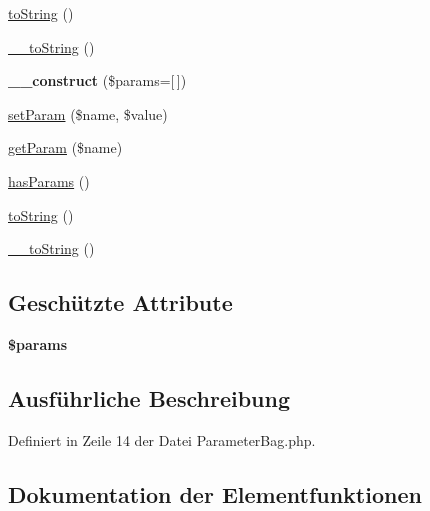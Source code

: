 \begin{DoxyCompactItemize}
\item 
\mbox{\hyperlink{class_eluceo_1_1i_cal_1_1_parameter_bag_a3dbe3cb1bc77cd42647b9c3b9cc1cd74}{to\+String}} ()
\item 
\mbox{\hyperlink{class_eluceo_1_1i_cal_1_1_parameter_bag_ad6ae633e87f62df95793c0b3bad3f2b6}{\+\_\+\+\_\+to\+String}} ()
\item 
\mbox{\label{class_eluceo_1_1i_cal_1_1_parameter_bag_a3869e226ebd229897354d1d70437e2e3}} 
{\bfseries \+\_\+\+\_\+construct} (\$params=\mbox{[}$\,$\mbox{]})
\item 
\mbox{\hyperlink{class_eluceo_1_1i_cal_1_1_parameter_bag_ac29f2bbb42fdbc435df23623ea5779cd}{set\+Param}} (\$name, \$value)
\item 
\mbox{\hyperlink{class_eluceo_1_1i_cal_1_1_parameter_bag_add3451bf728adf15b29f69a51b2bff08}{get\+Param}} (\$name)
\item 
\mbox{\hyperlink{class_eluceo_1_1i_cal_1_1_parameter_bag_aac985af3f6bb8a95591a6d6b553260ef}{has\+Params}} ()
\item 
\mbox{\hyperlink{class_eluceo_1_1i_cal_1_1_parameter_bag_a3dbe3cb1bc77cd42647b9c3b9cc1cd74}{to\+String}} ()
\item 
\mbox{\hyperlink{class_eluceo_1_1i_cal_1_1_parameter_bag_ad6ae633e87f62df95793c0b3bad3f2b6}{\+\_\+\+\_\+to\+String}} ()
\end{DoxyCompactItemize}
\subsection*{Geschützte Attribute}
\begin{DoxyCompactItemize}
\item 
\mbox{\label{class_eluceo_1_1i_cal_1_1_parameter_bag_a110ac454873412275bce444397ecf57b}} 
{\bfseries \$params}
\end{DoxyCompactItemize}


\subsection{Ausführliche Beschreibung}


Definiert in Zeile 14 der Datei Parameter\+Bag.\+php.



\subsection{Dokumentation der Elementfunktionen}
\mbox{\label{class_eluceo_1_1i_cal_1_1_parameter_bag_ad6ae633e87f62df95793c0b3bad3f2b6}} 
